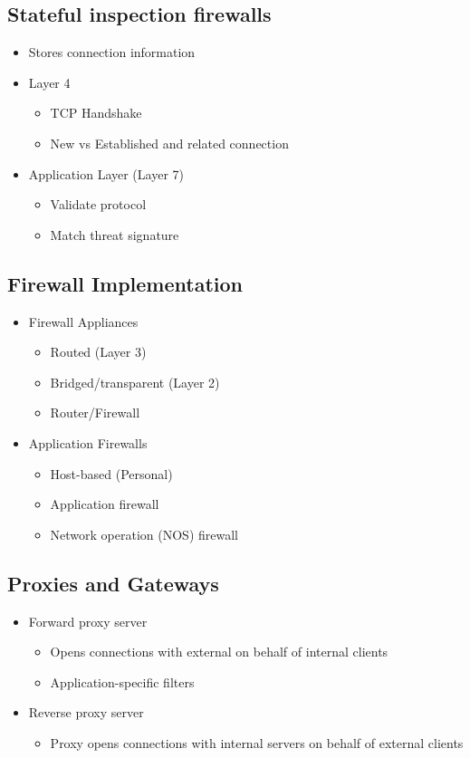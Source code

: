 	\subsection {Stateful inspection firewalls}
		\begin{itemize}
			\item Stores connection information
			\item Layer 4
				\begin{itemize}
					\item TCP Handshake
					\item New vs Established and related connection
				\end{itemize}
			\item Application Layer (Layer 7)
				\begin{itemize}
					\item Validate protocol
					\item Match threat signature
				\end{itemize}
		\end{itemize}
	\subsection {Firewall Implementation}
		\begin{itemize}
			\item Firewall Appliances
				\begin{itemize}
					\item Routed (Layer 3)
					\item Bridged/transparent (Layer 2)
					\item Router/Firewall
				\end{itemize}
			\item Application Firewalls
				\begin{itemize}
					\item Host-based (Personal)
					\item Application firewall
					\item Network operation (NOS) firewall
				\end{itemize}
		\end{itemize}
	\subsection {Proxies and Gateways}
		\begin{itemize}
			\item Forward proxy server
				\begin{itemize}
					\item Opens connections with external on behalf of internal clients
					\item Application-specific filters
				\end{itemize}
			\item Reverse proxy server
				\begin{itemize}
					\item Proxy opens connections with internal servers on behalf of
						external clients
				\end{itemize}
		\end{itemize}

